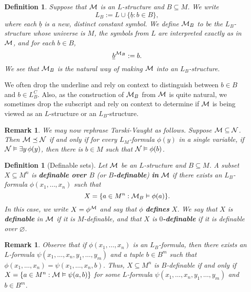 \documentclass[10pt]{article}
\theoremstyle{newstyle}
\newtheorem{remark}[thm]{Remark}
\newtheorem{defn}[thm]{Definition}
\begin{document}
\begin{defn}
Suppose that ${\cal M}$ is an $L$-structure and $B \subseteq M$. We write 
\[ L_B := L \cup \{ \underline{b} : b \in B \}, \] 
where each $\underline{b}$ is a new, distinct constant symbol. We define 
${\cal M}_B$ to be the $L_B$-structure whose universe is $M$, the symbols from $L$ 
are interpreted exactly as in ${\cal M}$, and for each $b \in B$, 
\[ \underline{b}^{{\cal M}_B} := b. \] 
We see that ${\cal M}_B$ is the natural way of making ${\cal M}$ into an $L_B$-structure. 
\end{defn}

We often drop the underline and rely on context to distinguish between 
$b \in B$ and $b \in L_B^C$. Also, as the construction of ${\cal M}_B$ from ${\cal M}$ 
is quite natural, we sometimes drop the subscript and rely on context to determine if 
${\cal M}$ is being viewed as an $L$-structure or an $L_B$-structure.

\begin{remark}
We may now rephrase Tarski-Vaught as follows. Suppose ${\cal M} \subseteq {\cal N}$. 
Then ${\cal M} \preceq {\cal N}$ if and only if for every $L_M$-formula $\phi(y)$ 
in a single variable, if ${\cal N} \vDash \exists y \, \phi(y)$, then there is 
$b \in M$ such that ${\cal N} \vDash \phi(b)$.
\end{remark}

\begin{defn}[Definable sets]
Let ${\cal M}$ be an $L$-structure and $B \subseteq M$. A subset $X \subseteq M^n$ is 
{\bf definable over $B$} (or {\bf $B$-definable}) {\bf in} ${\cal M}$ if there exists 
an $L_B$-formula $\phi(x_1, \dots, x_n)$ such that 
\[ X = \{a \in M^n : {\cal M}_B \vDash \phi(a)\}. \]
In this case, we write $X = \phi^{\cal M}$ and say that $\phi$ {\bf defines} $X$. 
We say that $X$ is {\bf definable} in ${\cal M}$ if it is $M$-definable, 
and that $X$ is {\bf $0$-definable} if it is definable over $\varnothing$. 
\end{defn}

\begin{remark}
Observe that if $\phi(x_1, \dots, x_n)$ is an $L_B$-formula, then there exists an $L$-formula 
$\psi(x_1, \dots, x_n, y_1, \dots, y_m)$ and a tuple $b \in B^m$ such that 
$\phi(x_1, \dots, x_n) = \psi(x_1, \dots, x_n, b)$. Thus, $X \subseteq M^n$ is $B$-definable 
if and only if $X = \{a \in M^n : {\cal M} \vDash \psi(a, b)\}$ for some $L$-formula 
$\psi(x_1, \dots, x_n, y_1, \dots, y_m)$ and $b \in B^m$.
\end{remark}
\end{document}
